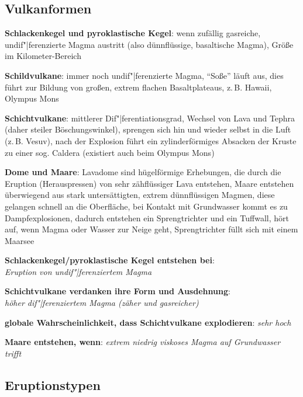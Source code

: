 \subsection{%
    Vulkanformen%
}

\textbf{Schlackenkegel und pyroklastische Kegel}:
wenn zufällig gasreiche, undif"|ferenzierte Magma austritt
(also dünnflüssige, basaltische Magma),
Größe im Kilometer-Bereich

\textbf{Schildvulkane}:
immer noch undif"|ferenzierte Magma,
"`Soße"' läuft aus,
dies führt zur Bildung von großen, extrem flachen Basaltplateaus,
z.\,B. Hawaii, Olympus Mons

\textbf{Schichtvulkane}:
mittlerer Dif"|ferentiationsgrad,
Wechsel von Lava und Tephra (daher steiler Böschungswinkel),
sprengen sich hin und wieder selbst in die Luft (z.\,B. Vesuv),
nach der Explosion führt ein zylinderförmiges Absacken der Kruste zu einer sog. Caldera
(existiert auch beim Olympus Mons)

\textbf{Dome und Maare}:
Lavadome sind hügelförmige Erhebungen, die durch die Eruption (Herauspressen) von
sehr zähflüssiger Lava entstehen,
Maare entstehen überwiegend aus stark untersättigten, extrem dünnflüssigen Magmen,
diese gelangen schnell an die Oberfläche,
bei Kontakt mit Grundwasser kommt es zu Dampfexplosionen,
dadurch entstehen ein Sprengtrichter und ein Tuffwall,
hört auf, wenn Magma oder Wasser zur Neige geht,
Sprengtrichter füllt sich mit einem Maarsee

\begin{wichtig}
    \item
    \textbf{Schlackenkegel/pyroklastische Kegel entstehen bei}:\\
    \emph{Eruption von undif"|ferenziertem Magma}

    \item
    \textbf{Schichtvulkane verdanken ihre Form und Ausdehnung}:\\
    \emph{höher dif"|ferenziertem Magma (zäher und gasreicher)}

    \item
    \textbf{globale Wahrscheinlichkeit, dass Schichtvulkane explodieren}:
    \emph{sehr hoch}

    \item
    \textbf{Maare entstehen, wenn}:
    \emph{extrem niedrig viskoses Magma auf Grundwasser trifft}
\end{wichtig}

\pagebreak

\subsection{%
    Eruptionstypen%
}

